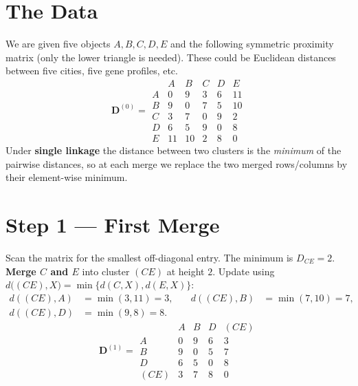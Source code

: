 \documentclass[11pt,a4paper]{report}
\theoremstyle{definition}
\theoremstyle{plain}
\theoremstyle{remark}
\begin{document}
\section{The Data}
We are given five objects $A,B,C,D,E$ and the following symmetric proximity
matrix (only the lower triangle is needed). These could be Euclidean distances
between five cities, five gene profiles, etc.
\begin{equation}
\mathbf{D}^{(0)}=
\begin{array}{c|ccccc}
   & A & B & C & D & E\\ \hline
A  & 0 & 9 & 3 & 6 & 11\\
B  & 9 & 0 & 7 & 5 & 10\\
C  & 3 & 7 & 0 & 9 & 2\\
D  & 6 & 5 & 9 & 0 & 8\\
E  & 11& 10& 2 & 8 & 0
\end{array}
\label{eq:D0}
\end{equation}
Under \textbf{single linkage} the distance between two clusters is the
\emph{minimum} of the pairwise distances, so at each merge we replace the two
merged rows/columns by their element-wise minimum.

\section{Step 1 --- First Merge}
Scan the matrix for the smallest off-diagonal entry. The minimum is
$D_{CE}=2$. \textbf{Merge $C$ and $E$} into cluster $(CE)$ at height $2$.
Update using $d\bigl((CE),X\bigr)=\min\{d(C,X),d(E,X)\}$:
\[
\begin{aligned}
d((CE),A)&=\min(3,11)=3, &\quad d((CE),B)&=\min(7,10)=7,\\
d((CE),D)&=\min(9,8)=8. &&
\end{aligned}
\]
\begin{equation}
\mathbf{D}^{(1)}=
\begin{array}{c|cccc}
    & A & B & D & (CE)\\ \hline
A   & 0 & 9 & 6 & 3\\
B   & 9 & 0 & 5 & 7\\
D   & 6 & 5 & 0 & 8\\
(CE)& 3 & 7 & 8 & 0
\end{array}
\end{equation}
\end{document}
